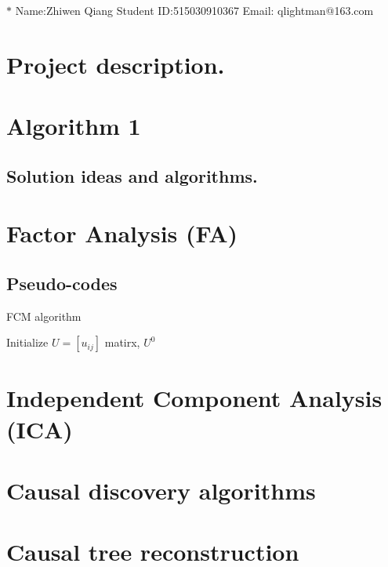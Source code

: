 \documentclass{article}
\theoremstyle{definition}
\numberwithin{equation}{section}
\numberwithin{figure}{section}
\begin{document}
\noindent

\noindent{}
\begin{center}

\footnotesize{\color{steelblue}$*$ Name:Zhiwen Qiang  \quad Student ID:515030910367 \quad Email: qlightman@163.com}
\end{center}

\section{Project description.}

\section{Algorithm 1}
\subsection{Solution ideas and algorithms.}







\section{Factor Analysis (FA)}

\subsection{Pseudo-codes}
\begin{algorithm}[H]
		\BlankLine
		\caption{FCM algorithm}\label{FCM}
		\BlankLine
        Initialize $U=[u_{ij}]$ matirx, $U^{0}$ \\
        
        
	\end{algorithm}



\section{Independent Component Analysis (ICA)}



\section{Causal discovery algorithms}
\section{Causal tree reconstruction}
\hspace{2mm}


\end{document}
